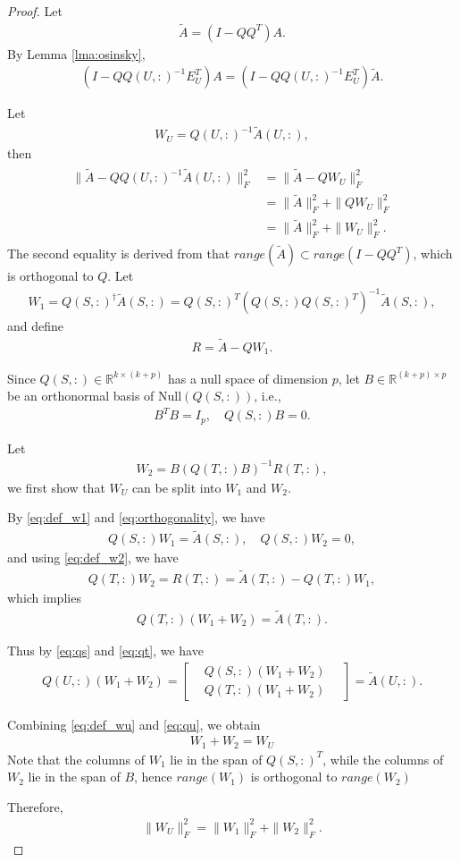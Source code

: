\documentclass[11pt]{article}
\newcommand{\be}{\begin{eqnarray}}
\newcommand{\ee}{\end{eqnarray}}
\newcommand{\<}{\langle}
\renewcommand{\>}{\rangle}
\begin{document}
\begin{proof}
    Let
\be
\widetilde A = (I - Q Q^T) A.
\ee
By Lemma \ref{lma:osinsky},
\be
(I - Q Q(U,:)^{-1} E_U^T) A
= (I - Q Q(U,:)^{-1} E_U^T)\widetilde A.
\ee

Let
\be
\label{eq:def_wu}
W_U = Q(U,:)^{-1} \widetilde A(U,:),
\ee
then
\be
\label{eq:pf1}
\begin{aligned}
  \| \widetilde A - Q Q(U,:)^{-1} \widetilde A(U,:) \|_F^2 &= \|\widetilde A - Q W_U\|_F^2\\
&= \|\widetilde A\|_F^2 + \|Q W_U\|_F^2\\
&= \|\widetilde A\|_F^2 + \|W_U\|_F^2.  
\end{aligned}
\ee
The second equality is derived from that $range(\widetilde A ) \subset range(I - QQ^T )$, which is orthogonal to $Q$.
Let
\be
\label{eq:def_w1}
W_1 = Q(S,:)^\dagger \widetilde A(S,:)
= Q(S,:)^T (Q(S,:)Q(S,:)^T)^{-1} \widetilde A(S,:),
\ee
and define
\be
\label{eq:def_r}
R = \widetilde A - Q W_1.
\ee

Since $Q(S,:) \in \mathbb{R}^{k \times (k+p)}$ has a null space of dimension $p$,
let $B \in \mathbb{R}^{(k+p)\times p}$ be an orthonormal basis of $\mathrm{Null}(Q(S,:))$,
i.e.,
\be \label{eq:orthogonality}
B^T B = I_p, \quad Q(S,:) B = 0.
\ee

Let
\be
\label{eq:def_w2}
W_2 = B (Q(T,:)B)^{-1} R(T,:), 
\ee
we first show that $W_U$ can be split into $W_1$ and $W_2$.

By \eqref{eq:def_w1} and \eqref{eq:orthogonality}, we have
\be
\label{eq:qs}
Q(S,:)W_1 = \widetilde A(S,:), \quad Q(S,:)W_2 = 0,
\ee
and using \eqref{eq:def_w2}, we have
\be
Q(T,:)W_2 = R(T,:) = \widetilde A(T,:) - Q(T,:)W_1,
\ee
which implies
\be
\label{eq:qt}
Q(T,:)(W_1 + W_2) = \widetilde A(T,:).
\ee

Thus by \eqref{eq:qs} and \eqref{eq:qt}, we have 
\be
\label{eq:qu}
Q(U,:)(W_1 + W_2) =  \begin{bmatrix}
&Q(S,:)(W_1 + W_2)\quad\\&Q(T,:)(W_1 + W_2)\quad
\end{bmatrix} = \widetilde A(U,:).
\ee

Combining \eqref{eq:def_wu} and \eqref{eq:qu}, we obtain
\be
\label{eq:split_wu}
W_1 + W_2 = W_U
\ee
Note that the columns of $W_1$ lie in the span of $Q(S,:)^T$, while the columns of $W_2$ lie in the span of $B$, hence $range(W_1)$ is orthogonal to $range(W_2)$

Therefore,
\be
\label{eq:norm_wu}
\|W_U\|_F^2 = \|W_1\|_F^2 + \|W_2\|_F^2. 
\ee


\end{proof}
\end{document}
